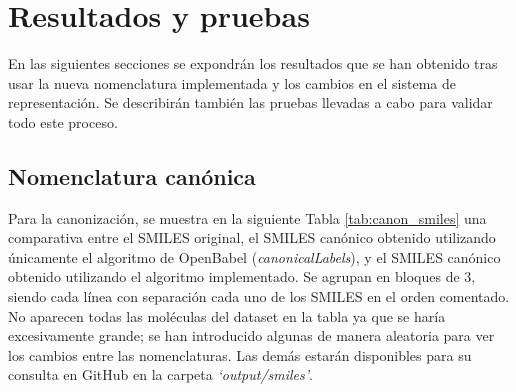 
\chapter{Resultados y pruebas}

En las siguientes secciones se expondrán los resultados que se han obtenido tras usar la nueva nomenclatura implementada y los cambios en el sistema de representación. Se describirán también las pruebas llevadas a cabo para validar todo este proceso.

\section{Nomenclatura canónica}

Para la canonización, se muestra en la siguiente Tabla \ref{tab:canon_smiles} una comparativa entre el SMILES original, el SMILES canónico obtenido utilizando únicamente el algoritmo de OpenBabel (\textit{canonicalLabels}), y el SMILES canónico obtenido utilizando el algoritmo implementado. Se agrupan en bloques de 3, siendo cada línea con separación cada uno de los SMILES en el orden comentado. No aparecen todas las moléculas del dataset en la tabla ya que se haría excesivamente grande; se han introducido algunas de manera aleatoria para ver los cambios entre las nomenclaturas. Las demás estarán disponibles para su consulta en GitHub en la carpeta \textit{`output/smiles'}.

